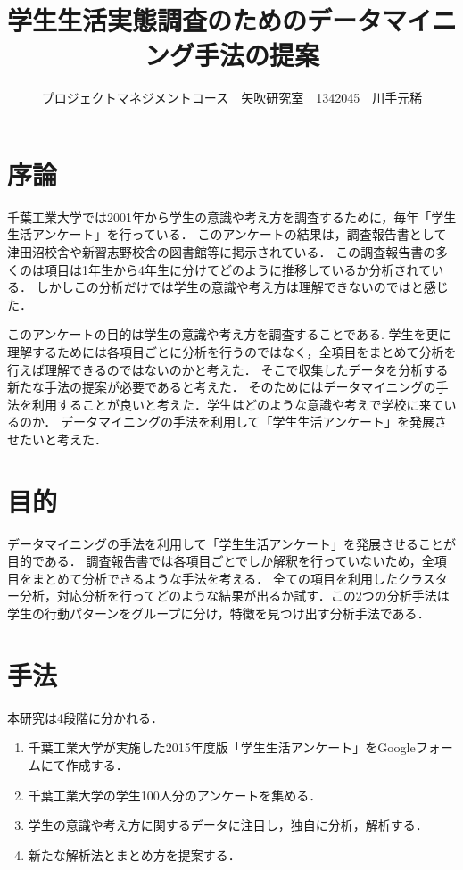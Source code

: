 \documentclass[uplatex,twocolumn,dvipdfmx]{jsarticle}
\title{\vspace{-5mm}\fontsize{14pt}{0pt}\selectfont 学生生活実態調査のためのデータマイニング手法の提案}
\author{\normalsize プロジェクトマネジメントコース　矢吹研究室　1342045　川手元稀}
\date{}
\begin{document}
\fontsize{10.5pt}{\baselineskip}\selectfont
\maketitle





\section{序論}
千葉工業大学では2001年から学生の意識や考え方を調査するために，毎年「学生生活アンケート」を行っている．
このアンケートの結果は，調査報告書として津田沼校舎や新習志野校舎の図書館等に掲示されている．
この調査報告書の多くのは項目は1年生から4年生に分けてどのように推移しているか分析されている．
しかしこの分析だけでは学生の意識や考え方は理解できないのではと感じた．

このアンケートの目的は学生の意識や考え方を調査することである\cite{a}.
学生を更に理解するためには各項目ごとに分析を行うのではなく，全項目をまとめて分析を行えば理解できるのではないのかと考えた．
そこで収集したデータを分析する新たな手法の提案が必要であると考えた．
そのためにはデータマイニングの手法を利用することが良いと考えた．学生はどのような意識や考えで学校に来ているのか．
データマイニングの手法を利用して「学生生活アンケート」を発展させたいと考えた．


\section{目的}
データマイニングの手法を利用して「学生生活アンケート」を発展させることが目的である．
調査報告書では各項目ごとでしか解釈を行っていないため，全項目をまとめて分析できるような手法を考える．
全ての項目を利用したクラスター分析，対応分析を行ってどのような結果が出るか試す．この2つの分析手法は学生の行動パターンをグループに分け，特徴を見つけ出す分析手法である\cite{b}．


\section{手法}
本研究は4段階に分かれる．

\begin{enumerate}
\item 千葉工業大学が実施した2015年度版「学生生活アンケート」をGoogleフォームにて作成する．
\item 千葉工業大学の学生100人分のアンケートを集める．
\item 学生の意識や考え方に関するデータに注目し，独自に分析，解析する．
\item 新たな解析法とまとめ方を提案する．
\end{enumerate}
\end{document}
